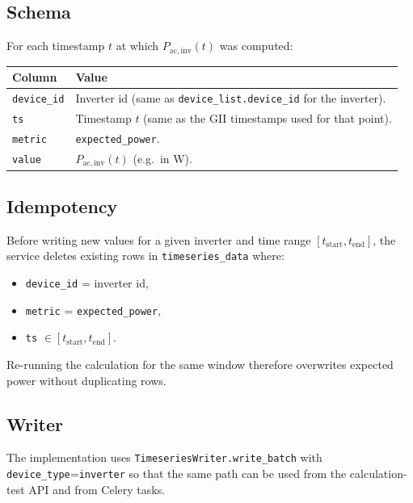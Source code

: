 \documentclass[11pt,a4paper]{article}
\begin{document}
\subsection{Schema}

For each timestamp \(t\) at which \(P_{\mathrm{ac,inv}}(t)\) was computed:

\begin{center}
\begin{tabular}{ll}
\toprule
Column & Value \\
\midrule
\texttt{device\_id} & Inverter id (same as \texttt{device\_list.device\_id} for the inverter). \\
\texttt{ts} & Timestamp \(t\) (same as the GII timestamps used for that point). \\
\texttt{metric} & \texttt{expected\_power}. \\
\texttt{value} & \(P_{\mathrm{ac,inv}}(t)\) (e.g.\ in W). \\
\bottomrule
\end{tabular}
\end{center}

\subsection{Idempotency}

Before writing new values for a given inverter and time range \([t_{\mathrm{start}}, t_{\mathrm{end}}]\), the service deletes existing rows in \texttt{timeseries\_data} where:

\begin{itemize}
  \item \texttt{device\_id} = inverter id,
  \item \texttt{metric} = \texttt{expected\_power},
  \item \texttt{ts} \(\in [t_{\mathrm{start}}, t_{\mathrm{end}}]\).
\end{itemize}

Re-running the calculation for the same window therefore overwrites expected power without duplicating rows.

\subsection{Writer}

The implementation uses \texttt{TimeseriesWriter.write\_batch} with \texttt{device\_type}=\texttt{inverter} so that the same path can be used from the calculation-test API and from Celery tasks.
\end{document}
